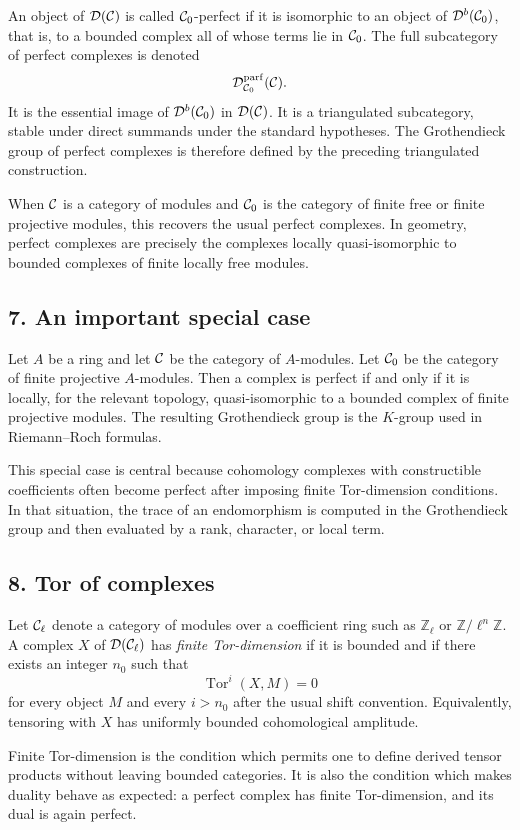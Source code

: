 \documentclass[11pt]{article}
\theoremstyle{plain}
\theoremstyle{definition}
\theoremstyle{remark}
\newcommand{\ZZ}{\mathbb Z}
\newcommand{\D}{\mathcal D}\newcommand{\E}{\mathcal E}\newcommand{\F}{\mathcal F}
\begin{document}
An object of $\D(\cC)$ is called $\mathcal C_0$-perfect if it is isomorphic to an object of $\D^b(\cC_0)$, that is, to a bounded complex all of whose terms lie in $\mathcal C_0$. The full subcategory of perfect complexes is denoted
\[
   \D^{\mathrm{parf}}_{\cC_0}(\cC).
\]
It is the essential image of $\D^b(\cC_0)$ in $\D(\cC)$. It is a triangulated subcategory, stable under direct summands under the standard hypotheses. The Grothendieck group of perfect complexes is therefore defined by the preceding triangulated construction.

When $\mathcal C$ is a category of modules and $\mathcal C_0$ is the category of finite free or finite projective modules, this recovers the usual perfect complexes. In geometry, perfect complexes are precisely the complexes locally quasi-isomorphic to bounded complexes of finite locally free modules.

\subsection*{7. An important special case}

Let $A$ be a ring and let $\mathcal C$ be the category of $A$-modules. Let $\mathcal C_0$ be the category of finite projective $A$-modules. Then a complex is perfect if and only if it is locally, for the relevant topology, quasi-isomorphic to a bounded complex of finite projective modules. The resulting Grothendieck group is the $K$-group used in Riemann--Roch formulas.

This special case is central because cohomology complexes with constructible coefficients often become perfect after imposing finite Tor-dimension conditions. In that situation, the trace of an endomorphism is computed in the Grothendieck group and then evaluated by a rank, character, or local term.

\subsection*{8. Tor of complexes}

Let $\mathcal C_\ell$ denote a category of modules over a coefficient ring such as $\ZZ_\ell$ or $\ZZ/\ell^n\ZZ$. A complex $X$ of $\D(\cC_\ell)$ has \emph{finite Tor-dimension} if it is bounded and if there exists an integer $n_0$ such that
\[
   \operatorname{Tor}^i(X,M)=0
\]
for every object $M$ and every $i>n_0$ after the usual shift convention. Equivalently, tensoring with $X$ has uniformly bounded cohomological amplitude.

Finite Tor-dimension is the condition which permits one to define derived tensor products without leaving bounded categories. It is also the condition which makes duality behave as expected: a perfect complex has finite Tor-dimension, and its dual is again perfect.
\end{document}
